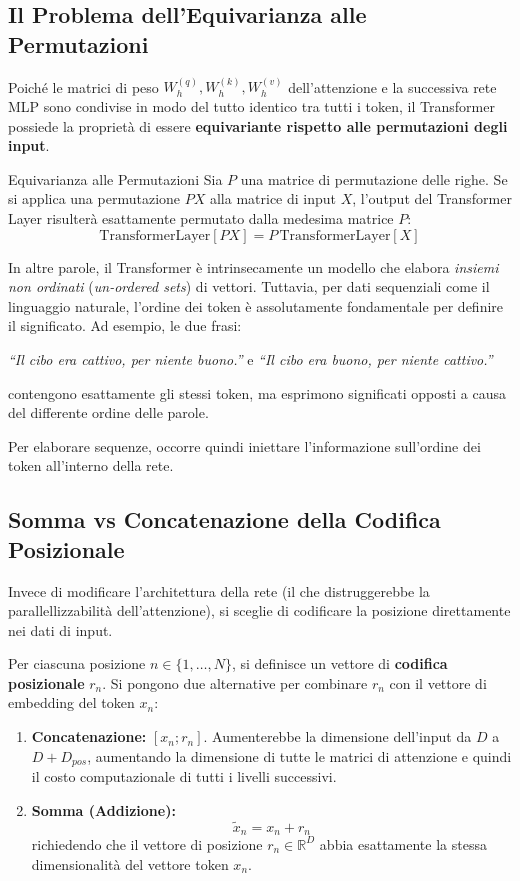 \subsection{Il Problema dell'Equivarianza alle Permutazioni}
Poiché le matrici di peso $W_h^{(q)}, W_h^{(k)}, W_h^{(v)}$ dell'attenzione e la successiva rete MLP sono condivise in modo del tutto identico tra tutti i token, il Transformer possiede la proprietà di essere \textbf{equivariante rispetto alle permutazioni degli input}.

\begin{definition}{Equivarianza alle Permutazioni}
Sia $P$ una matrice di permutazione delle righe. Se si applica una permutazione $P X$ alla matrice di input $X$, l'output del Transformer Layer risulterà esattamente permutato dalla medesima matrice $P$:
\begin{equation}
\text{TransformerLayer}[P X] = P \, \text{TransformerLayer}[X]
\end{equation}
\end{definition}

In altre parole, il Transformer è intrinsecamente un modello che elabora \emph{insiemi non ordinati} (\textit{un-ordered sets}) di vettori. Tuttavia, per dati sequenziali come il linguaggio naturale, l'ordine dei token è assolutamente fondamentale per definire il significato. Ad esempio, le due frasi:
\begin{center}
\textit{``Il cibo era cattivo, per niente buono.''} \quad e \quad \textit{``Il cibo era buono, per niente cattivo.''}
\end{center}
contengono esattamente gli stessi token, ma esprimono significati opposti a causa del differente ordine delle parole.

Per elaborare sequenze, occorre quindi iniettare l'informazione sull'ordine dei token all'interno della rete.

\subsection{Somma vs Concatenazione della Codifica Posizionale}
Invece di modificare l'architettura della rete (il che distruggerebbe la parallellizzabilità dell'attenzione), si sceglie di codificare la posizione direttamente nei dati di input.

Per ciascuna posizione \(n \in \{1, \dots, N\}\), si definisce un vettore di \textbf{codifica posizionale} \(r_n\). Si pongono due alternative per combinare \(r_n\) con il vettore di embedding del token \(x_n\):
\begin{enumerate}
    \item \textbf{Concatenazione:} \([x_n; r_n]\). Aumenterebbe la dimensione dell'input da \(D\) a \(D + D_{pos}\), aumentando la dimensione di tutte le matrici di attenzione e quindi il costo computazionale di tutti i livelli successivi.
    \item \textbf{Somma (Addizione):}
    \begin{equation}
    \tilde{x}_n = x_n + r_n
    \end{equation}
    richiedendo che il vettore di posizione \(r_n \in \mathbb{R}^D\) abbia esattamente la stessa dimensionalità del vettore token \(x_n\).
\end{enumerate}

